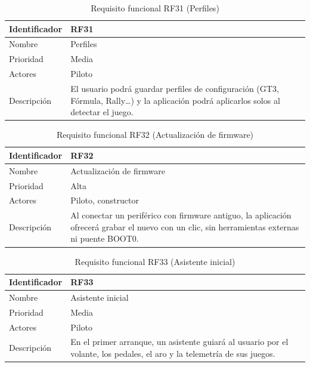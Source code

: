 \begin{table}[H]
	\centering
	\renewcommand{\arraystretch}{2}
	\begin{tabular}{|l|p{10cm}|}
		\hline
		Identificador & RF31 \\
		\hline
		Nombre & Perfiles \\
		\hline
		Prioridad & Media \\
		\hline
		Actores & Piloto \\
		\hline
		Descripción & El usuario podrá guardar perfiles de configuración (GT3, Fórmula, Rally\ldots) y la aplicación podrá aplicarlos solos al detectar el juego. \\
		\hline
	\end{tabular}
	\caption{Requisito funcional RF31 (Perfiles)}
	\label{tab:rf31}
\end{table}

\begin{table}[H]
	\centering
	\renewcommand{\arraystretch}{2}
	\begin{tabular}{|l|p{10cm}|}
		\hline
		Identificador & RF32 \\
		\hline
		Nombre & Actualización de firmware \\
		\hline
		Prioridad & Alta \\
		\hline
		Actores & Piloto, constructor \\
		\hline
		Descripción & Al conectar un periférico con firmware antiguo, la aplicación ofrecerá grabar el nuevo con un clic, sin herramientas externas ni puente BOOT0. \\
		\hline
	\end{tabular}
	\caption{Requisito funcional RF32 (Actualización de firmware)}
	\label{tab:rf32}
\end{table}

\begin{table}[H]
	\centering
	\renewcommand{\arraystretch}{2}
	\begin{tabular}{|l|p{10cm}|}
		\hline
		Identificador & RF33 \\
		\hline
		Nombre & Asistente inicial \\
		\hline
		Prioridad & Media \\
		\hline
		Actores & Piloto \\
		\hline
		Descripción & En el primer arranque, un asistente guiará al usuario por el volante, los pedales, el aro y la telemetría de sus juegos. \\
		\hline
	\end{tabular}
	\caption{Requisito funcional RF33 (Asistente inicial)}
	\label{tab:rf33}
\end{table}

